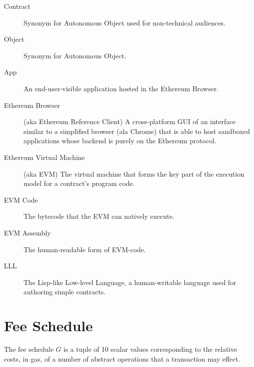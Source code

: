 \documentclass[9pt,oneside]{amsart}
\begin{document}
\begin{description}
\item[Contract] Synonym for Autonomous Object used for non-technical audiences.

\item[Object] Synonym for Autonomous Object.

\item[App] An end-user-visible application hosted in the Ethereum Browser.

\item[Ethereum Browser] (aka Ethereum Reference Client) A cross-platform GUI of an interface similar to a simplified browser (ala Chrome) that is able to host sandboxed applications whose backend is purely on the Ethereum protocol.

\item[Ethereum Virtual Machine] (aka EVM) The virtual machine that forms the key part of the execution model for a contract's program code.

\item[EVM Code] The bytecode that the EVM can natively execute.

\item[EVM Assembly] The human-readable form of EVM-code.

\item[LLL] The Lisp-like Low-level Language, a human-writable language used for authoring simple contracts.

\end{description}

\section{Fee Schedule}\label{app:fees}

The fee schedule $G$ is a tuple of 10 scalar values corresponding to the relative costs, in gas, of a number of abstract operations that a transaction may effect.
\end{document}
